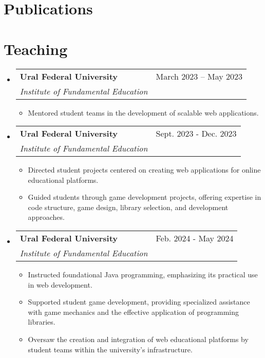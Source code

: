 \documentclass[a4paper,11pt]{article}
\makeatletter
\newcommand{\resumeItem}[1]{
    \item{
                {#1 \vspace{-4pt}}
          }
}
\newcommand{\resumeSubheading}[4]{
    \vspace{-2pt}\item
    \begin{tabular*}{0.97\textwidth}[t]{l@{\extracolsep{\fill}}r}
        \textbf{#1} & #2 \\
        \textit{\small #3} & \textit{\small #4} \\
    \end{tabular*}\vspace{-10pt}
}
\newcommand{\resumeSubHeadingListStart}{\begin{itemize}[leftmargin=0.15in, label={}]}
\newcommand{\resumeSubHeadingListEnd}{\end{itemize}}
\newcommand{\resumeItemListStart}{\begin{itemize}}
\newcommand{\resumeItemListEnd}{\end{itemize}\vspace{-2pt}}
\makeatother
\begin{document}
\section{Publications}
\begin{enumerate}[leftmargin=0.35in, labelindent=0pt, itemsep=0pt]
\normalsize{
}
\end{enumerate}

\section{Teaching}
\resumeSubHeadingListStart
    \resumeSubheading
        {Ural Federal University}{March 2023 -- May 2023}
        {Institute of Fundamental Education}{}
        \resumeItemListStart
            \small\resumeItem{Mentored student teams in the development of scalable web applications.}
        \resumeItemListEnd

    \resumeSubheading
        {Ural Federal University }{Sept. 2023 - Dec. 2023}
        {Institute of Fundamental Education}{}
        \resumeItemListStart
            \small\resumeItem{Directed student projects centered on creating web applications for online educational platforms.}
            \resumeItem{Guided students through game development projects, offering expertise in code structure, game design, library selection, and development approaches.}
        \resumeItemListEnd

    \resumeSubheading
        {Ural Federal University}{Feb. 2024 - May 2024}
        {Institute of Fundamental Education}{}
        \resumeItemListStart
            \small\resumeItem{Instructed foundational Java programming, emphasizing its practical use in web development.}
            \resumeItem{Supported student game development, providing specialized assistance with game mechanics and the effective application of programming libraries.}
            \resumeItem{Oversaw the creation and integration of web educational platforms by student teams within the university's infrastructure.}
        \resumeItemListEnd
\resumeSubHeadingListEnd
\end{document}
